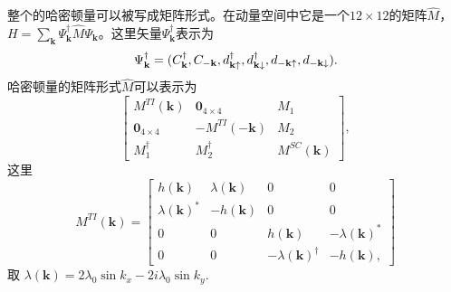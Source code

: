 \qquad 整个的哈密顿量可以被写成矩阵形式。在动量空间中它是一个$12\times 12$的矩阵$\hat{M}$，$H=\sum_{\mathbf{k}}\Psi_\mathbf{k}^\dagger\hat{M}\Psi_\mathbf{k}$。这里矢量$\Psi^\dagger_\mathbf{k}$表示为
\begin{equation}
\Psi^\dagger_{\bf k}=(C^\dagger_{\bf k},C_{-{\bf k}},d^\dagger_{{\bf k}\uparrow},d^\dagger_{{\bf k}\downarrow},d_{-{\bf k}\uparrow},d_{-{\bf k}\downarrow}).
\end{equation}
哈密顿量的矩阵形式$\hat{M}$可以表示为
\begin{equation}
\left[
\begin{array}{ccc}
M^{TI}(\mathbf{k}) & \mathbf{0}_{4\times 4} &M_1 \\
\mathbf{0}_{4\times 4} & -M^{TI}(\mathbf{-k}) & M_2 \\
M^{\dagger}_1 & M^{\dagger}_2 & M^{SC}(\mathbf{k})
\end{array}
\right],
\end{equation}
这里
\begin{equation}
M^{TI}(\mathbf{k})=\left[
\begin{array}{cccc}
h({\mathbf{k}}) & \lambda(\mathbf{k}) & 0 & 0 \\
\lambda(\mathbf{k})^* & -h({\mathbf{k}}) & 0 & 0 \\
0 & 0 & h({\mathbf{k}}) & -\lambda(\mathbf{k})^* \\
0 & 0 & -\lambda(\mathbf{k})^\dagger & -h({\mathbf{k}}),
\end{array}
\right]
\end{equation}
取 $\lambda(\mathbf{k})= 2\lambda_0\sin k_x- 2i\lambda_0\sin k_y$.

